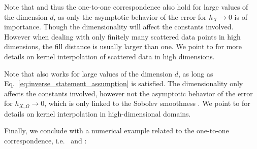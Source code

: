 \documentclass[a4paper, 10pt]{article}
\begin{document}
Note that  and thus the one-to-one correspondence also hold for large values of the dimension $d$,
as only the asymptotic behavior of the error for $h_{X} \rightarrow 0$ is of importance.
Though the dimensionality will affect the constants involved.
However when dealing with only finitely many scattered data points in high dimensions, 
the fill distance is usually larger than one.
We point to \cite{lin2024kernel} for more details on kernel interpolation of scattered data in high dimensions.



%
%
%
%
%
%





Note that  also works for large values of the dimension $d$,
as long as Eq.~\eqref{eq:inverse_statement_assumption} is satisfied.
The dimensionality only affects the constants involved, however not the asymptotic behavior of the error for $h_{X, \Omega} \rightarrow 0$,
which is only linked to the Sobolev smoothness .
We point to \cite{lin2024kernel} for details on kernel interpolation in high-dimensional domains.
%
%
%
%
%
%
%
%


%
%

%
%
%
%

Finally, we conclude with a numerical example related to the one-to-one correspondence,
i.e.\  and :
\end{document}
